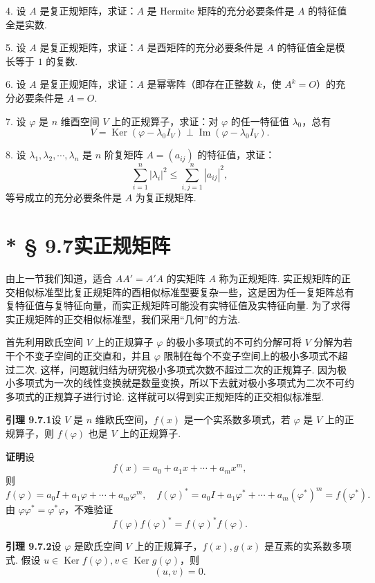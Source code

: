 \documentclass[UTF8,12pt,a4paper,fontset=fandol]{ctexart}
\begin{document}
4. 设 $A$ 是复正规矩阵，求证：$A$ 是 Hermite 矩阵的充分必要条件是 $A$ 的特征值全是实数.

5. 设 $A$ 是复正规矩阵，求证：$A$ 是酉矩阵的充分必要条件是 $A$ 的特征值全是模长等于 $1$ 的复数.

6. 设 $A$ 是复正规矩阵，求证：$A$ 是幂零阵（即存在正整数 $k$，使 $A^k=O$）的充分必要条件是 $A=O$.

7. 设 $\varphi$ 是 $n$ 维酉空间 $V$ 上的正规算子，求证：对 $\varphi$ 的任一特征值 $\lambda_0$，总有
\[
  V=\operatorname{Ker}(\varphi-\lambda_0 I_V)\perp \operatorname{Im}(\varphi-\lambda_0 I_V).
\]

8. 设 $\lambda_1,\lambda_2,\cdots,\lambda_n$ 是 $n$ 阶复矩阵 $A=(a_{ij})$ 的特征值，求证：
\[
  \sum_{i=1}^n|\lambda_i|^2\le \sum_{i,j=1}^n|a_{ij}|^2,
\]
等号成立的充分必要条件是 $A$ 为复正规矩阵.

\section*{* § 9.7\quad 实正规矩阵}

由上一节我们知道，适合 $AA'=A'A$ 的实矩阵 $A$ 称为正规矩阵. 实正规矩阵的正交相似标准型比复正规矩阵的酉相似标准型要复杂一些，这是因为任一复矩阵总有复特征值与复特征向量，而实正规矩阵可能没有实特征值及实特征向量. 为了求得实正规矩阵的正交相似标准型，我们采用“几何”的方法.

首先利用欧氏空间 $V$ 上的正规算子 $\varphi$ 的极小多项式的不可约分解可将 $V$ 分解为若干个不变子空间的正交直和，并且 $\varphi$ 限制在每个不变子空间上的极小多项式不超过二次. 这样，问题就归结为研究极小多项式次数不超过二次的正规算子. 因为极小多项式为一次的线性变换就是数量变换，所以下去就对极小多项式为二次不可约多项式的正规算子进行讨论. 这样就可以得到实正规矩阵的正交相似标准型.

\noindent\textbf{引理 9.7.1}\quad 设 $V$ 是 $n$ 维欧氏空间，$f(x)$ 是一个实系数多项式，若 $\varphi$ 是 $V$ 上的正规算子，则 $f(\varphi)$ 也是 $V$ 上的正规算子.

\noindent\textbf{证明}\quad 设
\[
  f(x)=a_0+a_1x+\cdots+a_mx^m,
\]
则
\[
  f(\varphi)=a_0I+a_1\varphi+\cdots+a_m\varphi^m,\quad
  f(\varphi)^*=a_0I+a_1\varphi^*+\cdots+a_m(\varphi^*)^m=f(\varphi^*).
\]
由 $\varphi\varphi^*=\varphi^*\varphi$，不难验证
\[
  f(\varphi)f(\varphi)^*=f(\varphi)^*f(\varphi).
\]

\noindent\textbf{引理 9.7.2}\quad 设 $\varphi$ 是欧氏空间 $V$ 上的正规算子，$f(x),g(x)$ 是互素的实系数多项式. 假设 $u\in\operatorname{Ker} f(\varphi),v\in\operatorname{Ker} g(\varphi)$，则
\[
  (u,v)=0.
\]
\end{document}
